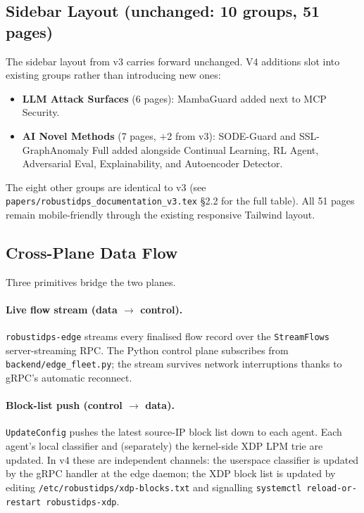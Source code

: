 \documentclass[11pt,a4paper]{article}
\begin{document}
\subsection{Sidebar Layout (unchanged: 10 groups, 51 pages)}

The sidebar layout from v3 carries forward unchanged.  V4 additions
slot into existing groups rather than introducing new ones:

\begin{itemize}[leftmargin=*,nosep]
  \item \textbf{LLM Attack Surfaces} (6 pages): MambaGuard added next
        to MCP Security.
  \item \textbf{AI Novel Methods} (7 pages, $+$2 from v3): SODE-Guard
        and SSL-GraphAnomaly Full added alongside Continual Learning,
        RL Agent, Adversarial Eval, Explainability, and Autoencoder
        Detector.
\end{itemize}

The eight other groups are identical to v3 (see
\texttt{papers/robustidps\_documentation\_v3.tex} \S2.2 for the full
table).  All 51 pages remain mobile-friendly through the existing
responsive Tailwind layout.

\subsection{Cross-Plane Data Flow}

Three primitives bridge the two planes.

\paragraph{Live flow stream (data $\to$ control).}
\texttt{robustidps-edge} streams every finalised flow record over the
\texttt{StreamFlows} server-streaming RPC.  The Python control plane
subscribes from \texttt{backend/edge\_fleet.py}; the stream survives
network interruptions thanks to gRPC's automatic reconnect.

\paragraph{Block-list push (control $\to$ data).}
\texttt{UpdateConfig} pushes the latest source-IP block list down to
each agent.  Each agent's local classifier and (separately) the
kernel-side XDP LPM trie are updated.  In v4 these are independent
channels: the userspace classifier is updated by the gRPC handler at
the edge daemon; the XDP block list is updated by editing
\texttt{/etc/robustidps/xdp-blocks.txt} and signalling
\texttt{systemctl reload-or-restart robustidps-xdp}.
\end{document}
